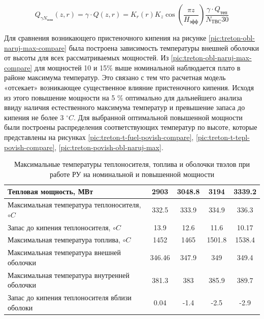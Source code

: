 \begin{equation}
	Q_{ \gamma N_{\text{ном}}}(z,r) 
	= \gamma \cdot Q(z,r) 
	= K_r(r) K_z \cos \left( 
		\frac{\pi z}{H_{\text{эфф}}} 
	  \right) 
	  \frac{\gamma \cdot Q_{\text{теп}}}{N_{\text{ТВС}} 30}
\end{equation}

Для сравнения возникающего пристеночного кипения на рисунке \ref{pic:treton-obl-naruj-max-compare} была построена зависимость температуры внешней оболочки от высоты для всех рассматриваемых мощностей. Из \ref{pic:treton-obl-naruj-max-compare} для мощностей 10 и 15\% выше номинальной наблюдается плато в районе максимума температур. Это связано с тем что расчетная модель «отсекает» возникающее существенное влияние пристеночного кипения. Исходя из этого повышение мощности на 5 \% оптимально для дальнейшего анализа ввиду наличия естественного максимума температур и превышение запаса до кипения не более 3 $^\circ C$. 
Для выбранной оптимальной повышенной мощности были построены распределения соответствующих температур по высоте, которые представлены на рисунках \ref{pic:treton-t-fuel-povish-compare}, \ref{pic:treton-t-tepl-povish-compare}, \ref{pic:treton-povish-obl-naruj-max}. 


\begin{table}[H]
    \caption{Максимальные температуры теплоносителя, топлива и оболочки твэлов при работе РУ на номинальной и повышенной мощности}
    \begin{center}
        \begin{tabular}{|l|c|c|c|c|}
        \toprule
        Тепловая мощность, МВт & 2903 & 3048.8 & 3194 & 3339.2 \\
        \midrule
        \hline
        Максимальная температура теплоносителя, $\circ C$ & 332.5 & 333.9 & 334.9 & 336.3  \\ 
        \hline
        Запас до кипения теплоносителя, $\circ C$ & 13.9 & 12.6 & 11.6 &  10.17 \\
        \hline
        Максимальная температура топлива, $\circ C$ & 1452 & 1465 & 1501.8 & 1538.4  \\
        \hline
        Максимальная температура внешней оболочки & 346.46 & 347.9 & 349  & 349.4 \\
        \hline
        Максимальная температура внутренней оболочки & 381.3 & 383 & 385.9 & 389.7 \\
        \hline
        Запас до кипения теплоносителя вблизи оболоки & 0.04 & -1.4 & -2.5 & -2.9 \\
        \bottomrule
        \end{tabular}
		\label{tabular:t_max_nominal_compare}
    \end{center}
\end{table}

